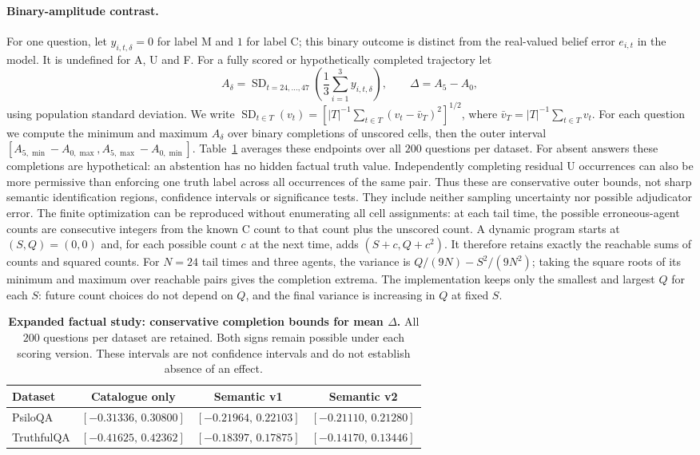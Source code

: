 \documentclass[11pt]{article}
\theoremstyle{definition}
\begin{document}
\paragraph{Binary-amplitude contrast.}
For one question, let $y_{i,t,\delta}=0$ for label M and $1$ for label C; this binary
outcome is distinct from the real-valued belief error $e_{i,t}$ in the model.
It is undefined for A, U and F. For a fully scored or hypothetically completed trajectory let
\[
 A_\delta=\operatorname{SD}_{t=24,\ldots,47}
       \left(\frac{1}{3}\sum_{i=1}^{3} y_{i,t,\delta}\right),
 \qquad \Delta=A_5-A_0,
\]
using population standard deviation. We write $\operatorname{SD}_{t\in T}(v_t)
=[|T|^{-1}\sum_{t\in T}(v_t-\bar v_T)^2]^{1/2}$, where
$\bar v_T=|T|^{-1}\sum_{t\in T}v_t$. For each question we compute the minimum and maximum
$A_\delta$ over binary completions of unscored cells, then the outer interval
$[A_{5,\min}-A_{0,\max}, A_{5,\max}-A_{0,\min}]$. Table~\ref{tab:expanded-bounds}
averages these endpoints over all $200$ questions per dataset. For absent answers these
completions are hypothetical: an abstention has no hidden factual truth value. Independently
completing residual U occurrences can also be more permissive than enforcing one truth label
across all occurrences of the same pair. Thus these are conservative outer bounds, not sharp
semantic identification regions, confidence intervals or significance tests. They include neither
sampling uncertainty nor possible adjudicator error. The finite optimization can be reproduced
without enumerating all cell assignments: at each tail time, the possible erroneous-agent counts
are consecutive integers from the known C count to that count plus the unscored count.
A dynamic program starts at $(S,Q)=(0,0)$ and, for each possible count $c$ at the next time,
adds $(S+c,Q+c^2)$. It therefore retains exactly the reachable sums of counts and squared counts.
For $N=24$ tail times and three agents, the variance is $Q/(9N)-S^2/(9N^2)$; taking the
square roots of its minimum and maximum over reachable pairs gives the completion extrema.
The implementation keeps only the smallest and largest $Q$ for each $S$: future count choices
do not depend on $Q$, and the final variance is increasing in $Q$ at fixed $S$.

\begin{table}[t]
\centering
\small
\begin{tabular}{lccc}
\hline
Dataset & Catalogue only & Semantic v1 & Semantic v2\\
\hline
PsiloQA & $[-0.31336,\,0.30800]$ & $[-0.21964,\,0.22103]$ & $[-0.21110,\,0.21280]$\\
TruthfulQA & $[-0.41625,\,0.42362]$ & $[-0.18397,\,0.17875]$ & $[-0.14170,\,0.13446]$\\
\hline
\end{tabular}
\caption{\textbf{Expanded factual study: conservative completion bounds for mean $\Delta$.}
All $200$ questions per dataset are retained. Both signs remain possible under each scoring
version. These intervals are not confidence intervals and do not establish absence of an effect.}
\label{tab:expanded-bounds}
\end{table}
\end{document}
